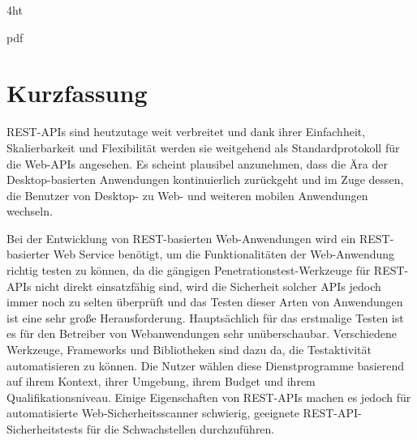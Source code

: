 \documentclass[
               paper=a4,
               twoside,  %
               bibliography=totoc,
               headsepline,
               cleardoublepage=empty,
               parskip=half,
               final
               ]{scrbook}
\begin{document}
\iftex4ht
\Configure{$}{\PicMath}{\EndPicMath}{} 

         {pdf}  
         {%
         }  
\fi

%
%




\Titelblatt

\pagestyle{preamble}
\renewcommand*{\chapterpagestyle}{preamble}



\ifdeutsch
\section*{Kurzfassung}                                                                                       

REST-APIs sind heutzutage weit verbreitet und dank ihrer Einfachheit, Skalierbarkeit und Flexibilität werden sie weitgehend als Standardprotokoll für die Web-APIs angesehen. Es scheint plausibel anzunehmen, dass die Ära der Desktop-basierten Anwendungen kontinuierlich zurückgeht und im Zuge dessen, die Benutzer von Desktop- zu Web- und weiteren mobilen Anwendungen wechseln.

Bei der Entwicklung von REST-basierten Web-Anwendungen wird ein REST-basierter Web Service benötigt, um die Funktionalitäten der Web-Anwendung richtig testen zu können, da die gängigen Penetrationstest-Werkzeuge für REST-APIs nicht direkt einsatzfähig sind, wird die Sicherheit solcher APIs jedoch immer noch zu selten überprüft und das Testen dieser Arten von Anwendungen ist eine sehr große Herausforderung. Hauptsächlich für das erstmalige Testen ist es für den Betreiber von Webanwendungen sehr unüberschaubar. Verschiedene Werkzeuge, Frameworks und Bibliotheken sind dazu da, die Testaktivität automatisieren zu können. Die Nutzer wählen diese Dienstprogramme basierend auf ihrem Kontext, ihrer Umgebung, ihrem Budget und ihrem Qualifikationsniveau. Einige Eigenschaften von REST-APIs machen es jedoch für automatisierte Web-Sicherheitsscanner schwierig, geeignete REST-API-Sicherheitstests für die Schwachstellen durchzuführen.
\end{document}
